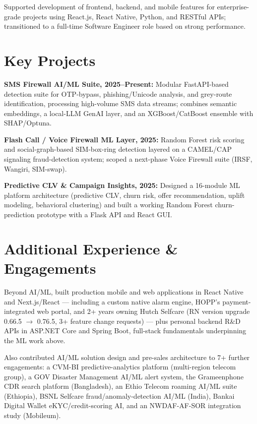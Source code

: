 \documentclass[10.5pt]{article}
\begin{document}
\begin{cvitems}
  \item Supported development of frontend, backend, and mobile features for enterprise-grade projects using React.js, React Native, Python, and RESTful APIs; transitioned to a full-time Software Engineer role based on strong performance.
\end{cvitems}

\section*{Key Projects}
\begin{cvitems}
  \item \textbf{SMS Firewall AI/ML Suite, 2025--Present:} Modular FastAPI-based detection suite for OTP-bypass, phishing/Unicode analysis, and grey-route identification, processing high-volume SMS data streams; combines semantic embeddings, a local-LLM GenAI layer, and an XGBoost/CatBoost ensemble with SHAP/Optuna.
  \item \textbf{Flash Call / Voice Firewall ML Layer, 2025:} Random Forest risk scoring and social-graph-based SIM-box-ring detection layered on a CAMEL/CAP signaling fraud-detection system; scoped a next-phase Voice Firewall suite (IRSF, Wangiri, SIM-swap).
  \item \textbf{Predictive CLV \& Campaign Insights, 2025:} Designed a 16-module ML platform architecture (predictive CLV, churn risk, offer recommendation, uplift modeling, behavioral clustering) and built a working Random Forest churn-prediction prototype with a Flask API and React GUI.
\end{cvitems}

\section*{Additional Experience \& Engagements}
Beyond AI/ML, built production mobile and web applications in React Native and Next.js/React --- including a custom native alarm engine, HOPP's payment-integrated web portal, and 2+ years owning Hutch Selfcare (RN version upgrade 0.66.5 $\rightarrow$ 0.76.5, 3+ feature change requests) --- plus personal backend R\&D APIs in ASP.NET Core and Spring Boot, full-stack fundamentals underpinning the ML work above.

Also contributed AI/ML solution design and pre-sales architecture to 7+ further engagements: a CVM-BI predictive-analytics platform (multi-region telecom group), a GOV Disaster Management AI/ML alert system, the Grameenphone CDR search platform (Bangladesh), an Ethio Telecom roaming AI/ML suite (Ethiopia), BSNL Selfcare fraud/anomaly-detection AI/ML (India), Bankai Digital Wallet eKYC/credit-scoring AI, and an NWDAF-AF-SOR integration study (Mobileum).
\end{document}
